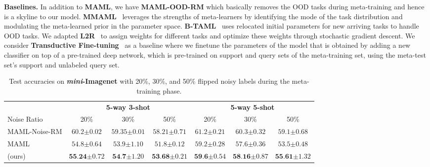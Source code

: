 \textbf{Baselines.} In addition to \textbf{MAML}, we have \textbf{MAML-OOD-RM} which basically removes the OOD tasks during meta-training and hence is a skyline to our model. \textbf{MMAML}~\citep{vuorio2019multimodal} leverages the strengths of meta-learners by identifying the mode of the task distribution and modulating the meta-learned prior in the parameter space. \textbf{B-TAML}~\citep{lee2020l2b} uses relocated initial parameters for new arriving tasks to handle OOD tasks. We adapted \textbf{L2R}~\citep{ren2018learning} to assign weights for different tasks and optimize these weights through stochastic gradient descent. We consider \textbf{Transductive Fine-tuning}~\citep{dhillon2019baseline} as a baseline where we finetune the parameters of the model that is obtained by adding a new classifier on top of a pre-trained deep network, which is pre-trained on support and query sets of the meta-training set, using the meta-test set's support and unlabeled query set.

\begin{table}[t!]
    \small
    
    \centering
    \begin{center}
    \vspace{-3mm}
    \begin{tabular}{l c c c | ccc}
        \toprule
         & \multicolumn{3}{c}{\textbf{5-way 3-shot}} & \multicolumn{3}{|c}{\textbf{5-way 5-shot}}\\
        
        Noise Ratio & 20\% & 30\% & 50\% & 20\% & 30\% & 50\%  \\
        \midrule
        MAML-Noise-RM & $60.2\scriptstyle{\pm 0.02}$ & $59.35\scriptstyle{\pm 0.01}$ & $58.21\scriptstyle{\pm 0.71}$ & $61.2\scriptstyle{\pm 0.21}$ & $60.3\scriptstyle{\pm 0.32}$ & $59.1\scriptstyle{\pm 0.68}$ \\
        \hline
        MAML    & $54.8\scriptstyle{\pm 0.64}$ & $53.9\scriptstyle{\pm 1.10}$ & $51.8\scriptstyle{\pm 0.12}$ & $59.2\scriptstyle{\pm 0.28}$ & $57.6\scriptstyle{\pm 0.36}$ & $53.5\scriptstyle{\pm 0.48}$   \\
        \sysname{} (ours) & $\textbf{55.24}\scriptstyle{\pm 0.72}$ & $\textbf{54.7}\scriptstyle{\pm 1.20}$ & $\textbf{53.68}\scriptstyle{\pm 0.21}$ & $\textbf{59.6}\scriptstyle{\pm 0.54}$ & $\textbf{58.16}\scriptstyle{\pm 0.87}$ & $\textbf{55.61}\scriptstyle{\pm 1.32}$ \\
        \bottomrule 
    \end{tabular}
\vspace{-3mm}
\end{center}
\vspace{-1mm}
\caption{Test accuracies on \textbf{\textit{mini}-Imagenet} with 20\%, 30\%, and 50\% flipped noisy labels during the meta-training phase.}
\label{tab:noise}
\end{table}

